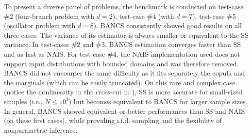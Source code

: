 To present a diverse panel of problems, the benchmark is conducted on test-case \#2 (four-branch problem with $d=2$), test-case \#4 (with $d=7$), test-case \#5 (oscillator problem with $d=8$). 
BANCS consistently showed good results on all three cases. 
The variance of its estimator is always smaller or equivalent to the SS variance. 
In test-cases \#2 and \#3, BANCS estimation converges faster than SS and as fast as NAIS. 
For test-case \#4, the NAIS implementation used does not support input distributions with bounded domains and was therefore removed. 
BANCS did not encounter the same difficulty as it fits separately the copula and the marginals (which can be easily truncated). 
On this rare and complex case (notice the nonlinearity in the cross-cut in ), SS is more accurate for small-sized samples (i.e., $N\leq 10^3$) but becomes equivalent to BANCS for larger sample sizes. 
In general, BANCS showed equivalent or better performances than SS and NAIS (on these first cases), while providing i.i.d. sampling and the flexibility of nonparametric inference.   

